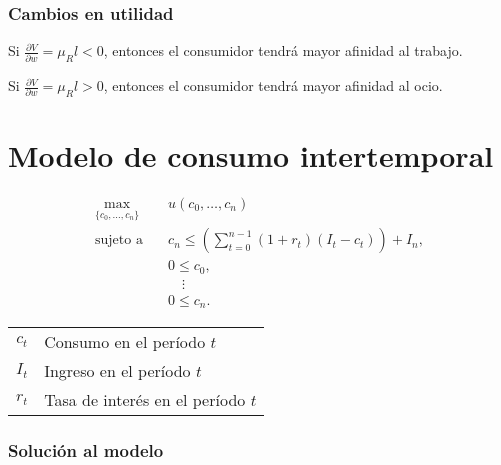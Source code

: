 \documentclass[8pt,a4paper]{extarticle}
\begin{document}
\begin{multicols}{3}
	\subsubsection*{Cambios en utilidad}

	\begin{eqlist}
		\item Si $\displaystyle \frac{\partial V}{\partial w} = \mu_R l < 0$, entonces el consumidor tendrá mayor afinidad al trabajo.
		\item Si $\displaystyle \frac{\partial V}{\partial w} = \mu_R l > 0$, entonces el consumidor tendrá mayor afinidad al ocio.
	\end{eqlist}

	\newpage

	\section{Modelo de consumo intertemporal}

	\begin{equation*}
		\begin{aligned}
			\max_{\{c_0, \ldots, c_n\}}\	 & u(c_0, \ldots, c_n)                                                \\
			\text{sujeto a} \quad        & c_n \le \left(\sum_{t=0}^{n-1} (1 + r_t)(I_t - c_t) \right) + I_n, \\
			                             & 0 \le c_0,                                                         \\
			                             & \quad \vdots                                                       \\
			                             & 0 \le c_n.
		\end{aligned}
	\end{equation*}

	\begin{center}
		\begin{tabular}{ c l }
			\hline
			$c_t$ & Consumo en el período $t$         \\
			$I_t$ & Ingreso en el período $t$         \\
			$r_t$ & Tasa de interés en el período $t$ \\
			\hline
		\end{tabular}
	\end{center}

	\subsubsection*{Solución al modelo}


\end{multicols}
\end{document}
